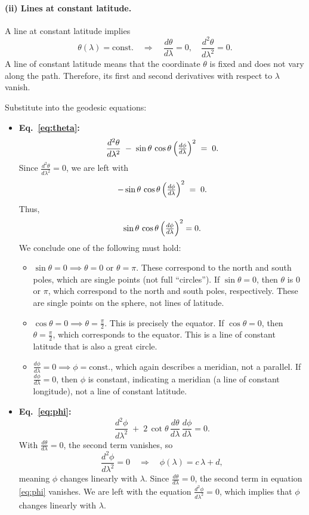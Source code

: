 \documentclass{article}
\begin{document}
\paragraph{(ii) Lines at constant latitude.}
A line at constant latitude implies
\[
\theta(\lambda) = \text{const.}
\quad\Longrightarrow\quad
\frac{d\theta}{d\lambda} = 0, \quad
\frac{d^2\theta}{d\lambda^2} = 0.
\]
A line of constant latitude means that the coordinate \(\theta\) is fixed and does not vary along the path. Therefore, its first and second derivatives with respect to \(\lambda\) vanish.

Substitute into the geodesic equations:

\begin{itemize}
\item \textbf{Eq.~\eqref{eq:theta}:}
\[
\frac{d^2 \theta}{d\lambda^2}
\;-\;
\sin\theta \,\cos\theta \,\Bigl(\tfrac{d\phi}{d\lambda}\Bigr)^2
\;=\; 0.
\]
Since \(\tfrac{d^2\theta}{d\lambda^2} = 0\), we are left with
\[
-\sin\theta \,\cos\theta \,\Bigl(\tfrac{d\phi}{d\lambda}\Bigr)^2
\;=\;
0.
\]
Thus,
\[
\sin\theta\,\cos\theta\,\Bigl(\tfrac{d\phi}{d\lambda}\Bigr)^2 = 0.
\]
We conclude one of the following must hold:

\begin{itemize}
\item \(\sin\theta = 0 \implies \theta=0 \text{ or } \theta=\pi\). These correspond to the north and south poles, which are single points (not full ``circles''). If \(\sin\theta = 0\), then \(\theta\) is \(0\) or \(\pi\), which correspond to the north and south poles, respectively. These are single points on the sphere, not lines of latitude.

\item \(\cos\theta = 0 \implies \theta = \tfrac{\pi}{2}\). This is precisely the equator. If \(\cos\theta = 0\), then \(\theta = \tfrac{\pi}{2}\), which corresponds to the equator. This is a line of constant latitude that is also a great circle.

\item \(\tfrac{d\phi}{d\lambda} = 0 \implies \phi=\text{const.}\), which again describes a meridian, not a parallel. If \(\tfrac{d\phi}{d\lambda} = 0\), then \(\phi\) is constant, indicating a meridian (a line of constant longitude), not a line of constant latitude.
\end{itemize}

\item \textbf{Eq.~\eqref{eq:phi}:}
\[
\frac{d^2 \phi}{d\lambda^2}
\;+\;
2 \,\cot\theta\,\frac{d\theta}{d\lambda}\,\frac{d\phi}{d\lambda}
= 0.
\]
With \(\tfrac{d\theta}{d\lambda} = 0\), the second term vanishes, so
\[
\frac{d^2 \phi}{d\lambda^2} = 0
\quad\Longrightarrow\quad
\phi(\lambda) = c\,\lambda + d,
\]
meaning \(\phi\) changes linearly with \(\lambda\). Since \(\tfrac{d\theta}{d\lambda} = 0\), the second term in equation \eqref{eq:phi} vanishes. We are left with the equation \(\tfrac{d^2 \phi}{d\lambda^2} = 0\), which implies that \(\phi\) changes linearly with \(\lambda\).
\end{itemize}
\end{document}
